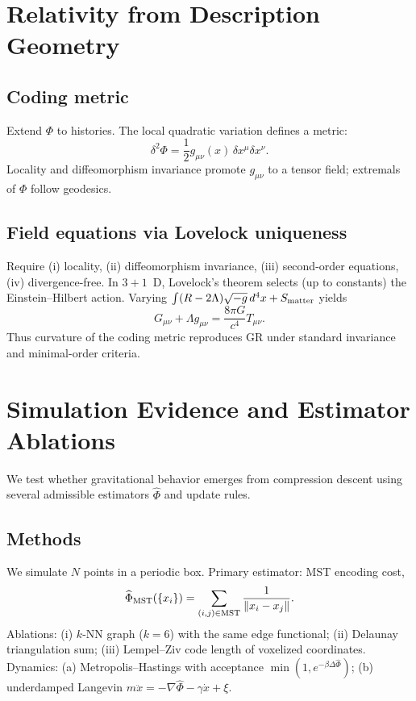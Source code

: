\documentclass[aps,preprint,onecolumn,longbibliography,nofootinbib]{revtex4-2}
\numberwithin{equation}{section}        %
\begin{document}
\section{Relativity from Description Geometry}
\subsection{Coding metric}
Extend $\Phi$ to histories. The local quadratic variation defines a metric:
\begin{equation}
\delta^2\Phi = \frac{1}{2} g_{\mu\nu}(x)\,\delta x^\mu \delta x^\nu. \label{eq:metric}
\end{equation}
Locality and diffeomorphism invariance promote $g_{\mu\nu}$ to a tensor field; extremals of $\Phi$ follow geodesics.

\subsection{Field equations via Lovelock uniqueness}
Require (i) locality, (ii) diffeomorphism invariance, (iii) second-order equations, (iv) divergence-free. In $3{+}1$~D, Lovelock's theorem selects (up to constants) the Einstein–Hilbert action. Varying $\int (R-2\Lambda)\sqrt{-g}\,d^4x + S_{\rm matter}$ yields
\begin{equation}
G_{\mu\nu}+\Lambda g_{\mu\nu} = \frac{8\pi G}{c^4}T_{\mu\nu}. \label{eq:einstein}
\end{equation}
Thus curvature of the coding metric reproduces GR under standard invariance and minimal-order criteria.

\section{Simulation Evidence and Estimator Ablations}
We test whether gravitational behavior emerges from compression descent using several admissible estimators $\widehat\Phi$ and update rules.

\subsection{Methods}
We simulate $N$ points in a periodic box. Primary estimator: MST encoding cost,
\begin{equation}
\widehat\Phi_{\rm MST}(\{x_i\})=\sum_{(i,j)\in {\rm MST}}\frac{1}{\|x_i-x_j\|}. \label{eq:mst}
\end{equation}
Ablations: (i) $k$-NN graph ($k{=}6$) with the same edge functional; (ii) Delaunay triangulation sum; (iii) Lempel–Ziv code length of voxelized coordinates. Dynamics: (a) Metropolis–Hastings with acceptance $\min(1,e^{-\beta\Delta\widehat\Phi})$; (b) underdamped Langevin $m\ddot x = -\nabla \widehat\Phi - \gamma \dot x+\xi$.
\end{document}
